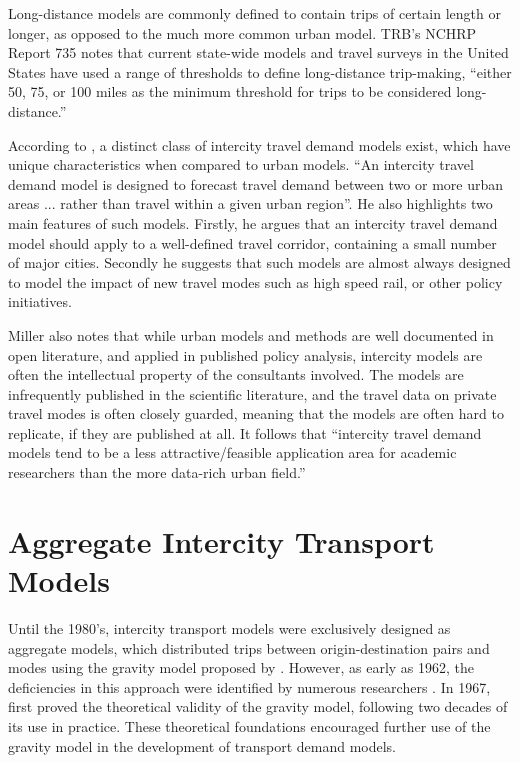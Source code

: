 Long-distance models are commonly defined to contain trips of certain length or longer, as opposed to the much more common urban model. TRB's NCHRP Report 735 notes that current state-wide models and travel surveys in the United States have used a range of thresholds to define long-distance trip-making, \enquote{either 50, 75, or 100 miles as the minimum threshold for trips to be considered long-distance.}\autocite{schif12}

According to \textcite{miller04}, a distinct class of intercity travel demand models exist, which have unique characteristics when compared to urban models. \enquote{An intercity travel demand model is designed to forecast travel demand between two or more urban areas ... rather than travel within a given urban region}. He also highlights two main features of such models. Firstly, he argues that an intercity travel demand model should apply to a well-defined travel corridor, containing a small number of major cities. Secondly he suggests that such models are almost always designed to model the impact of new travel modes such as high speed rail, or other policy initiatives.

Miller also notes that while urban models and methods are well documented in open literature, and applied in published policy analysis, intercity models are often the intellectual property of the consultants involved. The models are infrequently published in the scientific literature, and the travel data on private travel modes is often closely guarded, meaning that the models are often hard to replicate, if they are published at all. It follows that \enquote{intercity travel demand models tend to be a less attractive/feasible application area for academic researchers than the more data-rich urban field.} \parencite{miller04}

\section{Aggregate Intercity Transport Models}

Until the 1980’s, intercity transport models were exclusively designed as aggregate models, which distributed trips between origin-destination pairs and modes using the gravity model proposed by \autocite{casey55}. However, as early as 1962, the deficiencies in this approach were identified by numerous researchers \autocite*{OiSchu62, Warner62}. In 1967, \autocite{Wilson67} first proved the theoretical validity of the gravity model, following two decades of its use in practice. These theoretical foundations encouraged further use of the gravity model in the development of transport demand models. 

